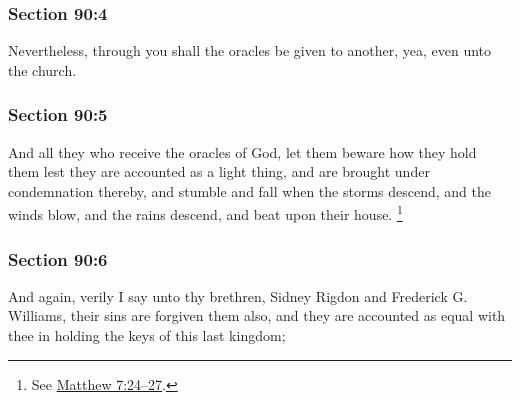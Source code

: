 	\subsubsection{Section 90:4} %
		\label{DC90-4}

		Nevertheless, through you shall the oracles be given to another, yea, even unto the church.


	\subsubsection{Section 90:5} %
		\label{DC90-5}

		And all they who receive the oracles of God, let them beware how they hold them lest they are accounted as a light thing, and are brought under condemnation thereby, and stumble and fall when the storms descend, and the winds blow, and the rains descend, and beat upon their house.%
			\footnote{%
				See \hyperref[MATTHEW-7-24]{Matthew 7:24--27}.
				} 


	\subsubsection{Section 90:6} %
		\label{DC90-6}

		And again, verily I say unto thy brethren, Sidney Rigdon and Frederick G. Williams, their sins are forgiven them also, and they are accounted as equal with thee in holding the keys of this last kingdom;


